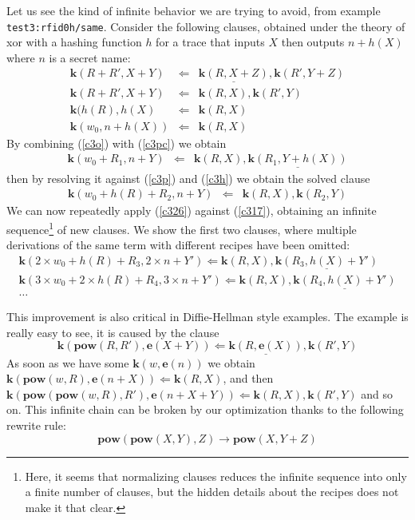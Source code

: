 \documentclass{article}
\newcommand{\mathcst}[1]{\mathrm{\textbf{#1}}}
\newcommand{\knows}{\mathcst{k}}
\newcommand{\pow}{\mathcst{pow}}
\newcommand{\e}{\mathcst{e}}
\newcommand{\ra}{\rightarrow}
\newcommand{\from}{\Leftarrow}
\begin{document}
Let us see the kind of infinite behavior we are trying to avoid,
from example \verb#test3:rfid0h/same#.
Consider the following clauses,
obtained under the theory of xor with a hashing function $h$
for a trace that inputs $X$ then outputs $n+h(X)$ where $n$ is a secret name:
\begin{eqnarray}
  \knows(R+R',X+Y) &\from& \underline{\knows(R,X+Z)}, \knows(R',Y+Z) \label{c3pc} \\
  \knows(R+R',X+Y) &\from& \knows(R,X), \knows(R',Y) \label{c3p} \\
  \knows(h(R),h(X) &\from& \knows(R,X) \label{c3h} \\
  \knows(w_0,n+h(X)) &\from& \knows(R,X) \label{c3o}
\end{eqnarray}
By combining (\ref{c3o}) with (\ref{c3pc}) we obtain
\begin{eqnarray}
  \knows(w_0+R_1,n+Y) &\from& \knows(R,X), \underline{\knows(R_1,Y+h(X))} \label{c317}
\end{eqnarray}
then by resolving it against (\ref{c3p}) and (\ref{c3h})
we obtain the solved clause
\begin{eqnarray}
  \knows(w_0+h(R)+R_2,n+Y) &\from& \knows(R,X), \knows(R_2,Y) \label{c326}
\end{eqnarray}
We can now repeatedly apply (\ref{c326}) against (\ref{c317}), obtaining
an infinite sequence\footnote{
  Here, it seems that normalizing clauses reduces the infinite sequence 
  into only a finite number of clauses, but the hidden details about the recipes 
  does not make it that clear.
} of new clauses.
We show the first two clauses, where multiple derivations of the same
term with different recipes have been omitted:
\[ \begin{array}{l}
    \knows(2 \times w_0 +h(R)+R_3, 2\times n +Y') \from
    \knows(R,X), \underline{\knows(R_3,h(X)+Y')}
    \\
    \knows(3 \times w_0+ 2 \times h(R)+R_4,3 \times n +Y') \from
    \knows(R,X), \underline{\knows(R_4,h(X)+Y')}
    \\
    \ldots
\end{array} \]

This improvement is also critical in Diffie-Hellman style examples.
The example is really easy to see, it is caused by the clause
\[
  \knows(\pow(R,R'),\e(X+Y)) \from \underline{\knows(R,\e(X))}, \knows(R',Y) 
\]
As soon as we have some $\knows(w,\e(n))$ we obtain
$\knows(\pow(w,R),\e(n+X)) \from \knows(R,X)$, and then
$\knows(\pow(\pow(w,R),R'),\e(n+X+Y)) \from \knows(R,X), \knows(R',Y)$
and so on.
This infinite chain can be broken by our optimization
thanks to the following rewrite rule:
\[ \pow(\pow(X,Y),Z) \ra \pow(X,Y+Z) \]
\end{document}
